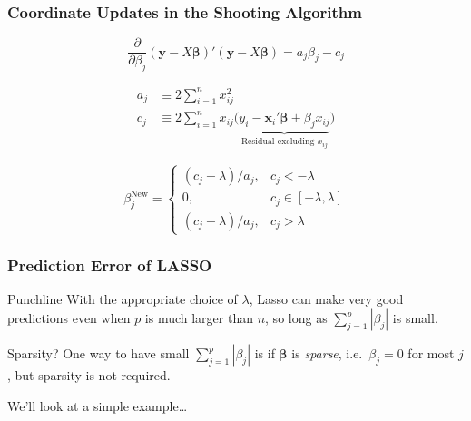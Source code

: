 \begin{frame}
  \frametitle{Coordinate Updates in the Shooting Algorithm}

\[
\frac{\partial}{\partial \beta_j} \left( \mathbf{y} - X \boldsymbol{\beta} \right)'\left( \mathbf{y} - X \boldsymbol{\beta} \right) = a_j \beta_j - c_j
\]

\vspace{-1em}

  \begin{align*}
    a_j &\equiv 2\sum_{i=1}^n x_{ij}^2\\
    c_j &\equiv 2\sum_{i=1}^n x_{ij}\big(\underbrace{y_i - \mathbf{x}_i'\boldsymbol{\beta} + \beta_j x_{ij}}_{\text{Residual excluding } x_{ij}}\big)
  \end{align*}

  \[
    \beta_j^{\text{New}} = \left\{
    \begin{array}{rl}
      (c_j + \lambda)/a_j, & c_j < -\lambda\\
      0, & c_j \in [-\lambda, \lambda]\\
      (c_j - \lambda)/a_j, & c_j > \lambda
    \end{array}
  \right.
  \]
\end{frame}
\begin{frame}
  \frametitle{Prediction Error of LASSO}

  \begin{block}{Punchline}
    With the appropriate choice of $\lambda$, Lasso can make very good predictions even when $p$ is much larger than $n$, so long as $\sum_{j=1}^p |\beta_j|$ is small.
  \end{block}

  \begin{block}{Sparsity?}
    One way to have small $\sum_{j=1}^p |\beta_j|$ is if $\boldsymbol{\beta}$ is \emph{sparse}, i.e.\ $\beta_j = 0$ for most $j$, but sparsity is not required.
  \end{block}

  \vspace{1em}
  \alert{We'll look at a simple example\dots}

\end{frame}
